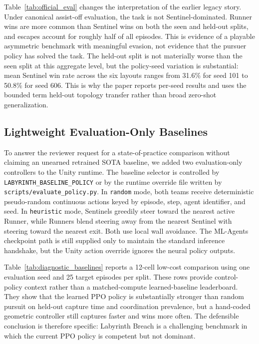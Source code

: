 \documentclass[journal]{IEEEtran}
\begin{document}
Table~\ref{tab:official_eval} changes the interpretation of the earlier
legacy story. Under canonical assist-off evaluation, the task is not
Sentinel-dominated. Runner wins are more common than Sentinel wins on both the
seen and held-out splits, and escapes account for roughly half of all episodes.
This is evidence of a playable asymmetric benchmark with meaningful evasion,
not evidence that the pursuer policy has solved the task. The held-out split is
not materially worse than the seen split at this aggregate level, but the
policy-seed variation is substantial: mean Sentinel win rate across the six
layouts ranges from 31.6\% for seed 101 to 50.8\% for seed 606. This is why the
paper reports per-seed results and uses the bounded term held-out topology
transfer rather than broad zero-shot generalization.

\subsection{Lightweight Evaluation-Only Baselines}

To answer the reviewer request for a state-of-practice comparison without
claiming an unearned retrained SOTA baseline, we added two evaluation-only
controllers to the Unity runtime. The baseline selector is controlled by
\texttt{LABYRINTH\_BASELINE\_POLICY} or by the runtime override file written by
\texttt{scripts/evaluate\_policy.py}. In \texttt{random} mode, both teams
receive deterministic pseudo-random continuous actions keyed by episode, step,
agent identifier, and seed. In \texttt{heuristic} mode, Sentinels greedily steer
toward the nearest active Runner, while Runners blend steering away from the
nearest Sentinel with steering toward the nearest exit. Both use local wall
avoidance. The ML-Agents checkpoint path is still supplied only to maintain the
standard inference handshake, but the Unity action override ignores the neural
policy outputs.

Table~\ref{tab:diagnostic_baselines} reports a 12-cell low-cost comparison
using one evaluation seed and 25 target episodes per split. These rows provide
control-policy context rather than a matched-compute learned-baseline
leaderboard. They show that the learned PPO policy is substantially stronger
than random pursuit on held-out capture time and coordination prevalence, but a
hand-coded geometric controller still captures faster and wins more often. The
defensible conclusion is therefore specific: Labyrinth Breach is a challenging
benchmark in which the current PPO policy is competent but not dominant.
\end{document}
